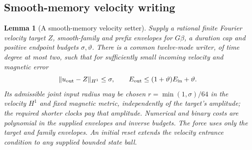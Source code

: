 \documentclass[11pt,a4paper]{amsart}
\newtheorem{lemma}[theorem]{Lemma}
\theoremstyle{definition}
\theoremstyle{remark}
\numberwithin{equation}{section}
\newcommand{\norm}[1]{\lVert #1\rVert}
\begin{document}
\subsection{Smooth-memory velocity writing}
\begin{lemma}[A smooth-memory velocity setter]\label{lem:writer}
Supply a rational finite Fourier velocity target $Z$, smooth-family and
prefix envelopes for $G\beta$, a duration cap and positive endpoint
budgets $\sigma,\vartheta$.  There is a common twelve-mode writer, of
time degree at most two, such that for sufficiently small incoming
velocity and magnetic error
\begin{equation}\label{eq:memory-writer}
 \norm{u_{\rm out}-Z}_{H^1}\le\sigma,
 \qquad E_{\rm out}\le(1+\vartheta)E_{\rm in}+\vartheta.
\end{equation}
Its admissible joint input radius may be chosen
$r=\min(1,\sigma)/64$ in the velocity $H^1$ and fixed magnetic metric,
independently of the target's amplitude; the required shorter clocks pay
that amplitude.  Numerical and binary costs are polynomial in the
supplied envelopes and inverse budgets.  The force uses only the target
and family envelopes.  An initial reset extends the velocity entrance
condition to any supplied bounded state ball.
\end{lemma}
\end{document}
